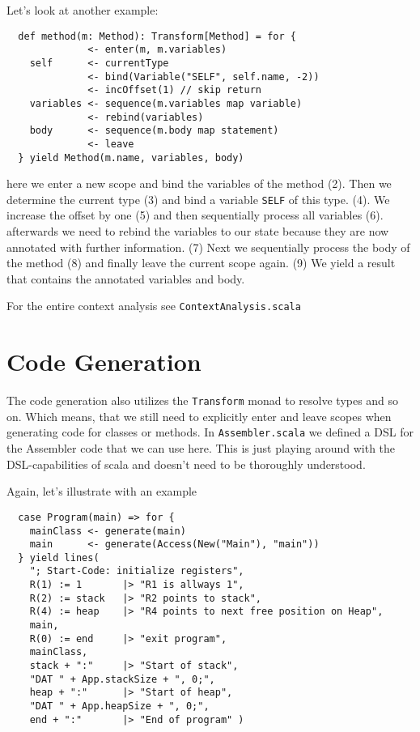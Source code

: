 \documentclass{style}
\begin{document}
Let's look at another example:

\begin{lstlisting}
  def method(m: Method): Transform[Method] = for {
              <- enter(m, m.variables)    
    self      <- currentType
              <- bind(Variable("SELF", self.name, -2))
              <- incOffset(1) // skip return
    variables <- sequence(m.variables map variable)
              <- rebind(variables)
    body      <- sequence(m.body map statement)
              <- leave
  } yield Method(m.name, variables, body)
\end{lstlisting}

here we enter a new scope and bind the variables of the method (2). Then we determine the current type (3) and bind a variable \texttt{SELF} of this type. (4). We increase the offset by one (5) and then sequentially process all variables (6). afterwards we need to rebind the variables to our state because they are now annotated with further information. (7) Next we sequentially process the body of the method (8) and finally leave the current scope again. (9) We yield a result that contains the annotated variables and body.

For the entire context analysis see \texttt{ContextAnalysis.scala}

\section{Code Generation}

The code generation also utilizes the \texttt{Transform} monad to resolve types and so on. Which means, that we still need to explicitly enter and leave scopes when generating code for classes or methods. In \texttt{Assembler.scala} we defined a DSL for the Assembler code that we can use here. This is just playing around with the DSL-capabilities of scala and doesn't need to be thoroughly understood.

Again, let's illustrate with an example

\begin{lstlisting}
  case Program(main) => for {
    mainClass <- generate(main)
    main      <- generate(Access(New("Main"), "main"))      
  } yield lines(
    "; Start-Code: initialize registers",
    R(1) := 1       |> "R1 is allways 1",
    R(2) := stack   |> "R2 points to stack",
    R(4) := heap    |> "R4 points to next free position on Heap",
    main,
    R(0) := end     |> "exit program",
    mainClass,
    stack + ":"     |> "Start of stack",
    "DAT " + App.stackSize + ", 0;",
    heap + ":"      |> "Start of heap",
    "DAT " + App.heapSize + ", 0;",
    end + ":"       |> "End of program" )
\end{lstlisting}
\end{document}
